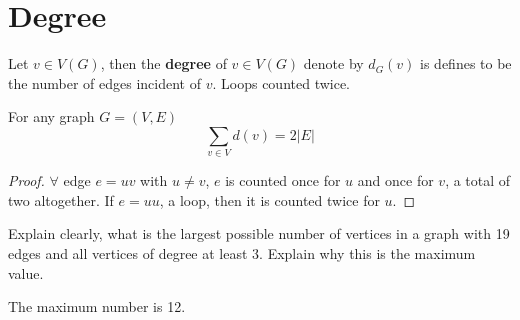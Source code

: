 
			\section{Degree}
				\begin{definition}[Degree]
					Let $v\in V(G)$, then the \textbf{degree} of $v\in V(G)$ denote by $d_G(v)$ is defines to be the number of edges incident of $v$. Loops counted twice.
				\end{definition}

				\begin{theorem}
					For any graph $G=(V, E)$
					\begin{equation}
						\sum_{v\in V}d(v) = 2|E|
					\end{equation}
				\end{theorem}

				\begin{proof}
					$\forall$ edge $e=uv$ with $u \neq v$, $e$ is counted once for $u$ and once for $v$, a total of two altogether. If $e=uu$, a loop, then it is counted twice for $u$.
				\end{proof}

				\begin{problem}
					Explain clearly, what is the largest possible number of vertices in a graph with 19 edges and all vertices of degree at least 3. Explain why this is the maximum value.
				\end{problem}

				\begin{solution}
					The maximum number is 12.
				\end{solution}

